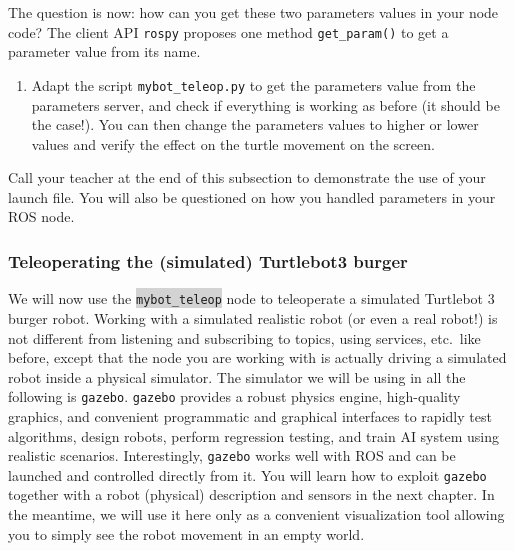 \documentclass[10pt,a4paper,printanswers]{upmc}
\newcounter{mainmemorder}
\newcommand{\save}{\setcounter{mainmemorder}{\value{enumi}}}
\newcommand{\load}{\setcounter{enumi}{\value{mainmemorder}}}
\newcommand{\mytext}[1]{\colorbox{lightgray}{\texttt{#1}}}
\begin{document}
\newpage
The question is now: how can you get these two parameters values in your node code? The
client API \texttt{rospy} proposes one method \texttt{get\_param()} to get a parameter value from
its name.

\begin{enumerate}
  \load
  \item Adapt the script \texttt{mybot\_teleop.py} to get the parameters value from the parameters
        server, and check if everything is working as before (it should be the case!). You can then
        change the parameters values to higher or lower values and verify the effect on the turtle
        movement on the screen.
        \save
\end{enumerate}
\begin{mdframed}[style=evaluation]
  Call your teacher at the end of this subsection to demonstrate the use of your
  launch file. You will also be questioned on how you handled parameters in your ROS node.
\end{mdframed}


\subsubsection{Teleoperating the (simulated) Turtlebot3 burger}

We will now use the \mytext{mybot\_teleop} node to teleoperate a simulated Turtlebot 3 burger robot.
Working with a simulated realistic robot (or even a real robot!) is not different from listening and
subscribing to topics, using services, etc.\ like before, except that the node you are working with
is actually driving a simulated robot inside a physical simulator. The simulator we will be using in
all the following is \texttt{gazebo}. \texttt{gazebo} provides a robust physics engine, high-quality
graphics, and convenient programmatic and graphical interfaces to rapidly test algorithms, design
robots, perform regression testing, and train AI system using realistic scenarios. Interestingly,
\texttt{gazebo} works well with ROS and can be launched and controlled directly from it. You will
learn how to exploit \texttt{gazebo} together with a robot (physical) description and sensors in the
next chapter. In the meantime, we will use it here only as a convenient visualization tool allowing
you to simply see the robot movement in an empty world.
\end{document}

